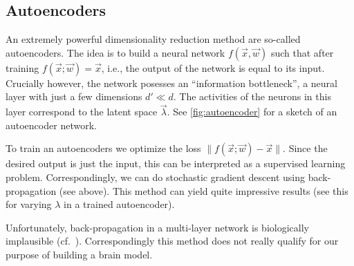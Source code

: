 \documentclass[10pt,letterpaper,oneside]{article}
\begin{document}
\subsection{Autoencoders}

An extremely powerful dimensionality reduction method are so-called autoencoders. The idea is to build a neural network $f(\vec x, \vec w)$ such that after training $f(\vec x; \vec w) = \vec x$, i.e., the output of the network is equal to its input. Crucially however, the network posesses an \enquote{information bottleneck}, a neural layer with just a few dimensions $d' \ll d$. The activities of the neurons in this layer correspond to the latent space $\vec \lambda$. See \cref{fig:autoencoder} for a sketch of an autoencoder network.

To train an autoencoders we optimize the loss $\| f(\vec x; \vec w) - \vec x \|$. Since the desired output is just the input, this can be interpreted as a supervised learning problem. Correspondingly, we can do stochastic gradient descent using back-propagation (see above). This method can yield quite impressive results (see this  for varying $\lambda$ in a trained autoencoder).

Unfortunately, back-propagation in a multi-layer network is biologically implausible (cf.~\cite{hunsberger2018spiking}). Correspondingly this method does not really qualify for our purpose of building a brain model.
\end{document}
